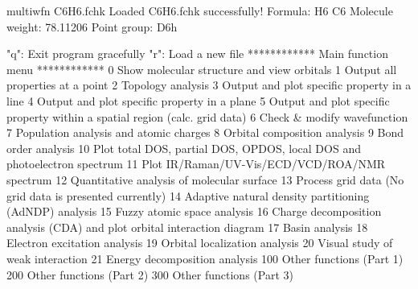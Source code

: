 \documentclass[a4paper,11pt,openany]{memoir}
\begin{document}
\begin{appendices}
\begin{consola}{multiwfn C6H6.fchk}
Loaded C6H6.fchk successfully!
Formula: H6 C6
Molecule weight:        78.11206
Point group: D6h

"q": Exit program gracefully          "r": Load a new file
************ Main function menu ************
0 Show molecular structure and view orbitals
1 Output all properties at a point
2 Topology analysis
3 Output and plot specific property in a line
4 Output and plot specific property in a plane
5 Output and plot specific property within a spatial region (calc. grid data)
6 Check & modify wavefunction
7 Population analysis and atomic charges
8 Orbital composition analysis
9 Bond order analysis
10 Plot total DOS, partial DOS, OPDOS, local DOS and photoelectron spectrum
11 Plot IR/Raman/UV-Vis/ECD/VCD/ROA/NMR spectrum
12 Quantitative analysis of molecular surface
13 Process grid data (No grid data is presented currently)
14 Adaptive natural density partitioning (AdNDP) analysis
15 Fuzzy atomic space analysis
16 Charge decomposition analysis (CDA) and plot orbital interaction diagram
17 Basin analysis                    18 Electron excitation analysis
19 Orbital localization analysis     20 Visual study of weak interaction
21 Energy decomposition analysis
100 Other functions (Part 1)         200 Other functions (Part 2)
300 Other functions (Part 3)
\end{consola}


\end{appendices}
\end{document}
